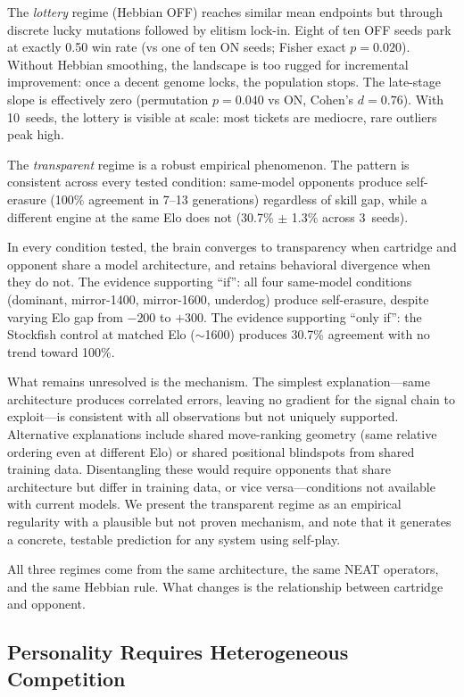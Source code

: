 \documentclass[11pt,a4paper]{article}
\begin{document}
The \emph{lottery} regime (Hebbian OFF) reaches similar mean endpoints but through discrete lucky mutations followed by elitism lock-in.
Eight of ten OFF seeds park at exactly 0.50 win rate (vs one of ten ON seeds; Fisher exact $p = 0.020$).
Without Hebbian smoothing, the landscape is too rugged for incremental improvement: once a decent genome locks, the population stops.
The late-stage slope is effectively zero (permutation $p = 0.040$ vs ON, Cohen's $d = 0.76$).
With 10~seeds, the lottery is visible at scale: most tickets are mediocre, rare outliers peak high.

The \emph{transparent} regime is a robust empirical phenomenon.
The pattern is consistent across every tested condition: same-model opponents produce self-erasure (100\% agreement in 7--13 generations) regardless of skill gap, while a different engine at the same Elo does not (30.7\% $\pm$ 1.3\% across 3~seeds).

In every condition tested, the brain converges to transparency when cartridge and opponent share a model architecture, and retains behavioral divergence when they do not.
The evidence supporting ``if'': all four same-model conditions (dominant, mirror-1400, mirror-1600, underdog) produce self-erasure, despite varying Elo gap from $-200$ to $+300$.
The evidence supporting ``only if'': the Stockfish control at matched Elo ($\sim$1600) produces 30.7\% agreement with no trend toward 100\%.

What remains unresolved is the mechanism.
The simplest explanation---same architecture produces correlated errors, leaving no gradient for the signal chain to exploit---is consistent with all observations but not uniquely supported.
Alternative explanations include shared move-ranking geometry (same relative ordering even at different Elo) or shared positional blindspots from shared training data.
Disentangling these would require opponents that share architecture but differ in training data, or vice versa---conditions not available with current models.
We present the transparent regime as an empirical regularity with a plausible but not proven mechanism, and note that it generates a concrete, testable prediction for any system using self-play.

All three regimes come from the same architecture, the same NEAT operators, and the same Hebbian rule.
What changes is the relationship between cartridge and opponent.

\subsection{Personality Requires Heterogeneous Competition}
\end{document}

